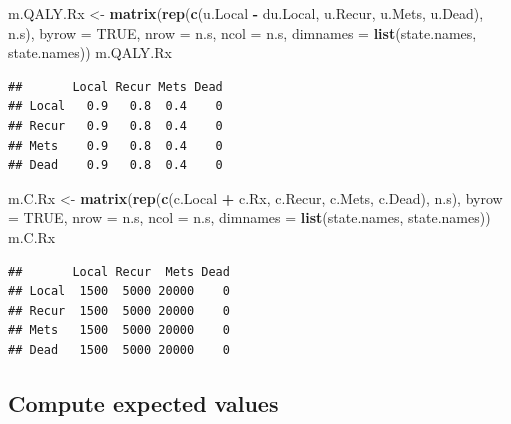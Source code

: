 \documentclass[]{article}
\newenvironment{Shaded}{\begin{snugshade}}{\end{snugshade}}
\newcommand{\KeywordTok}[1]{\textcolor[rgb]{0.13,0.29,0.53}{\textbf{#1}}}
\newcommand{\DataTypeTok}[1]{\textcolor[rgb]{0.13,0.29,0.53}{#1}}
\newcommand{\StringTok}[1]{\textcolor[rgb]{0.31,0.60,0.02}{#1}}
\newcommand{\OtherTok}[1]{\textcolor[rgb]{0.56,0.35,0.01}{#1}}
\newcommand{\OperatorTok}[1]{\textcolor[rgb]{0.81,0.36,0.00}{\textbf{#1}}}
\newcommand{\NormalTok}[1]{#1}
\theoremstyle{definition}
\theoremstyle{definition}
\theoremstyle{definition}
\theoremstyle{remark}
\begin{document}
\begin{Shaded}
\begin{Highlighting}[]
\NormalTok{m.QALY.Rx <-}\StringTok{ }\KeywordTok{matrix}\NormalTok{(}\KeywordTok{rep}\NormalTok{(}\KeywordTok{c}\NormalTok{(u.Local }\OperatorTok{-}\StringTok{ }\NormalTok{du.Local, u.Recur, u.Mets, u.Dead), n.s),}
                    \DataTypeTok{byrow =} \OtherTok{TRUE}\NormalTok{,}
                 \DataTypeTok{nrow =}\NormalTok{ n.s, }\DataTypeTok{ncol =}\NormalTok{ n.s, }
                 \DataTypeTok{dimnames =} \KeywordTok{list}\NormalTok{(state.names, state.names))}
\NormalTok{m.QALY.Rx}
\end{Highlighting}
\end{Shaded}

\begin{verbatim}
##       Local Recur Mets Dead
## Local   0.9   0.8  0.4    0
## Recur   0.9   0.8  0.4    0
## Mets    0.9   0.8  0.4    0
## Dead    0.9   0.8  0.4    0
\end{verbatim}

\begin{Shaded}
\begin{Highlighting}[]
\NormalTok{m.C.Rx <-}\StringTok{ }\KeywordTok{matrix}\NormalTok{(}\KeywordTok{rep}\NormalTok{(}\KeywordTok{c}\NormalTok{(c.Local }\OperatorTok{+}\StringTok{ }\NormalTok{c.Rx, c.Recur, c.Mets, c.Dead), n.s),}
                 \DataTypeTok{byrow =} \OtherTok{TRUE}\NormalTok{,}
                 \DataTypeTok{nrow =}\NormalTok{ n.s, }\DataTypeTok{ncol =}\NormalTok{ n.s, }
                 \DataTypeTok{dimnames =} \KeywordTok{list}\NormalTok{(state.names, state.names))}
\NormalTok{m.C.Rx}
\end{Highlighting}
\end{Shaded}

\begin{verbatim}
##       Local Recur  Mets Dead
## Local  1500  5000 20000    0
## Recur  1500  5000 20000    0
## Mets   1500  5000 20000    0
## Dead   1500  5000 20000    0
\end{verbatim}

\subsection{Compute expected values}\label{compute-expected-values-1}

\begin{Shaded}
\end{Shaded}
\end{document}
